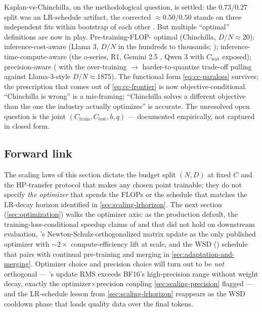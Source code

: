 \begin{contradiction}
Kaplan-vs-Chinchilla, on the methodological question, is settled:
the $0.73/0.27$ split was an LR-schedule artifact, the corrected
$\approx 0.50/0.50$ stands on three independent fits within bootstrap
of each other \citep[\S 3, Table 2]{hoffmann2022-chinchilla}. But
multiple ``optimal'' definitions are now in play. Pre-training-FLOP-
optimal (Chinchilla, $D / N \approx 20$); inference-cost-aware (Llama
3, $D / N$ in the hundreds to thousands; \citealp{meta-llama3});
inference-time-compute-aware (the o-series, R1, Gemini 2.5
\citep{gemini2-5}, Qwen 3 \citep{qwen3} with $C_{\text{test}}$
exposed); precision-aware (\citealp{scaling-laws-precision-2024} with
the over-training $\to$ harder-to-quantize trade-off pulling against
Llama-3-style $D/N \approx 1875$). The functional form
\cref{eq:cc-paraloss} survives; the prescription that comes out of
\cref{eq:cc-frontier} is now objective-conditional. ``Chinchilla is
wrong'' is a mis-framing; ``Chinchilla solves a different objective
than the one the industry actually optimizes'' is accurate. The
unresolved open question is the joint $(C_{\text{train}},
C_{\text{test}}, b, q)$  --- documented empirically, not
captured in closed form.
\end{contradiction}

\subsection{Forward link}
\label{sec:scaling-forward}

The scaling laws of this section dictate the budget split
$(N, D)$ at fixed $C$ and the HP-transfer protocol that makes any
chosen point trainable; they do not specify \emph{the optimizer} that
spends the FLOPs or the schedule that matches the LR-decay horizon
identified in \cref{sec:scaling-lrhorizon}. The next section
(\cref{sec:optimization}) walks the optimizer axis:  as the
production default, the training-loss-conditional speedup claims of
 and  that did not hold on downstream evaluation, 's
Newton-Schulz-orthogonalized matrix update as the only published
optimizer with $\sim 2\times$ compute-efficiency lift at  scale,
and the WSD () schedule that pairs with continual
pre-training and merging in \cref{sec:adaptation-and-merging}.
Optimizer choice and precision choice will turn out to be \emph{not}
orthogonal --- 's update RMS exceeds BF16's high-precision range
without weight decay, exactly the optimizer$\times$precision coupling
\cref{sec:scaling-precision} flagged --- and the LR-schedule lesson
from \cref{sec:scaling-lrhorizon} reappears as the WSD cooldown phase
that loads quality data over the final tokens.
